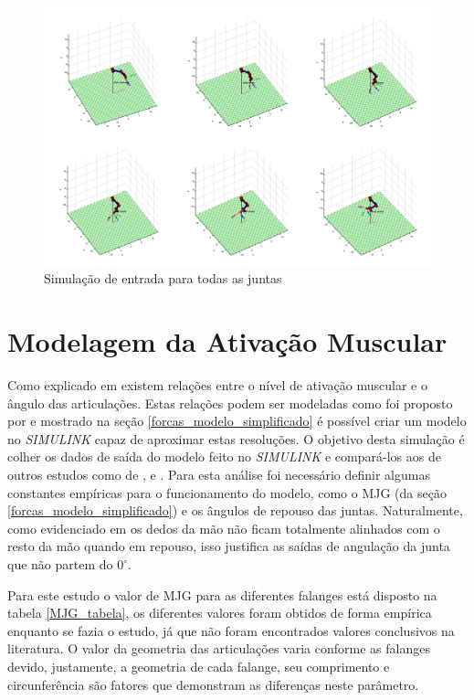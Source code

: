 \begin{figure}[H]
\centering
\includegraphics[width = 1\textwidth]{img/sim_total.png}
\caption[Simulação de entrada para todas as juntas]{Simulação de entrada para todas as juntas}
\label{sim_DH}
\end{figure}

\section{Modelagem da Ativação Muscular}
\label{resultado_ativacao}
Como explicado em \cite{zajac1989muscle} existem relações entre o nível de ativação muscular e o ângulo das articulações. Estas relações podem ser modeladas como foi proposto por \cite{feng1999surface} e mostrado na seção \ref{forcas_modelo_simplificado} é possível criar um modelo no \textit{SIMULINK} capaz de aproximar estas resoluções. O objetivo desta simulação é colher os dados de saída do modelo feito no \textit{SIMULINK} e compará-los aos de outros estudos como de \cite{zajac1989muscle}, \cite{rosen1999performances} e \cite{feng1999surface}. Para esta análise foi necessário definir algumas constantes empíricas para o funcionamento do modelo, como o MJG (da seção \ref{forcas_modelo_simplificado}) e os ângulos de repouso das juntas. Naturalmente, como evidenciado em \cite{lin2000modeling} os dedos da mão não ficam totalmente alinhados com o resto da mão quando em repouso, isso justifica as saídas de angulação da junta que não partem do $0^\circ$. 

Para este estudo o valor de MJG para as diferentes falanges está disposto na tabela \ref{MJG_tabela}, os diferentes valores foram obtidos de forma empírica enquanto se fazia o estudo, já que não foram encontrados valores conclusivos na literatura. O valor da geometria das articulações varia conforme as falanges devido, justamente, a geometria de cada falange, seu comprimento e circunferência são fatores que demonstram as diferenças neste parâmetro.

